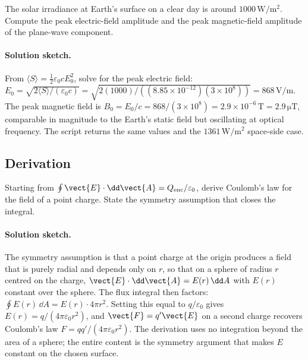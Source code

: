 \begin{exercise}
The solar irradiance at Earth's surface on a clear day is around
$1000\,\si{\watt\per\meter\squared}$. Compute the peak electric-field
amplitude and the peak magnetic-field amplitude of the plane-wave
component.

\paragraph{Solution sketch.} From $\langle S\rangle = \tfrac12
\varepsilon_0 c E_0^2$, solve for the peak electric field: $E_0 =
\sqrt{2\langle S\rangle/(\varepsilon_0 c)} = \sqrt{2(1000)/((8.85\times
10^{-12})(3\times 10^8))} = 868\,\si{\volt\per\meter}$. The peak
magnetic field is $B_0 = E_0/c = 868/(3\times 10^8) = 2.9\times
10^{-6}\,\si{\tesla} = 2.9\,\si{\micro\tesla}$, comparable in magnitude
to the Earth's static field but oscillating at optical frequency. The
script  returns the same values and the
$1361\,\si{\watt\per\meter\squared}$ space-side case.
\end{exercise}

\subsection*{Derivation}

\begin{exercise}
Starting from $\oint \vect{E}\cdot \dd\vect{A} = Q_{\text{enc}}/
\varepsilon_{0}$, derive Coulomb's law for the field of a point
charge. State the symmetry assumption that closes the integral.

\paragraph{Solution sketch.} The symmetry assumption is that a point
charge at the origin produces a field that is purely radial and depends
only on $r$, so that on a sphere of radius $r$ centred on the charge,
$\vect{E}\cdot\dd\vect{A} = E(r)\,\dd A$ with $E(r)$ constant over the
sphere. The flux integral then factors: $\oint E(r)\,\dd A = E(r)\cdot
4\pi r^2$. Setting this equal to $q/\varepsilon_0$ gives $E(r) =
q/(4\pi\varepsilon_0 r^2)$, and $\vect{F} = q'\vect{E}$ on a second
charge recovers Coulomb's law $F = q q'/(4\pi\varepsilon_0 r^2)$. The
derivation uses no integration beyond the area of a sphere; the entire
content is the symmetry argument that makes $E$ constant on the chosen
surface.
\end{exercise}

